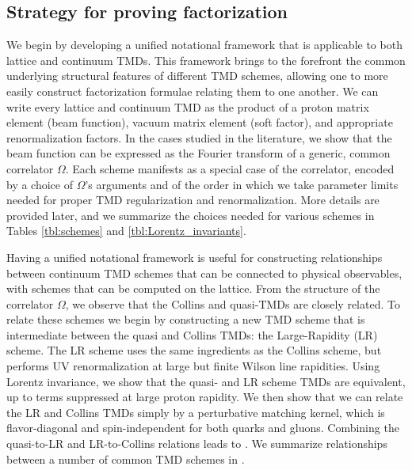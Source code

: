 \documentclass[11pt,a4paper]{article}
\newcommand{\Corr}{\Omega}
\begin{document}
\subsection{Strategy for proving factorization} 
\label{sec:strategy}

We begin by developing a unified notational framework that is applicable to both lattice and continuum TMDs. 
This framework brings to the forefront the common underlying structural features of different TMD schemes, allowing one to more easily construct factorization formulae relating them to one another. 
We can write every lattice and continuum TMD as the product of a 
proton matrix element (beam function), vacuum matrix element (soft factor), 
and appropriate renormalization factors. 
In the cases studied in the literature, we show that the beam function 
can be expressed
as the Fourier transform of a generic, common correlator 
$\Corr$. Each scheme manifests as a special case of the correlator, encoded by 
a choice of $\Corr$'s arguments and of the order in which we take parameter limits needed for proper TMD regularization and renormalization.
%
More details are provided later, and we summarize the choices needed for various schemes in Tables \ref{tbl:schemes} and \ref{tbl:Lorentz_invariants}. 
	
Having a unified notational framework is useful for constructing relationships between continuum TMD schemes that can be connected to physical observables, with schemes that can be computed on the lattice. 
From the structure of the correlator $\Corr$, we observe that the Collins and quasi-TMDs are closely related. 
To relate these schemes we begin by constructing a new TMD scheme that is intermediate between the quasi and Collins TMDs: the Large-Rapidity (LR) scheme.
The LR scheme uses the same ingredients as the Collins scheme, but performs UV renormalization at large but finite Wilson line rapidities.
Using Lorentz invariance, we show that the quasi- and LR scheme TMDs are equivalent, up to terms suppressed at large proton rapidity. 
We then show that we can relate the LR and Collins TMDs simply by a perturbative matching kernel, which is flavor-diagonal and spin-independent for both quarks and gluons. 
Combining the quasi-to-LR and LR-to-Collins relations leads to . We summarize relationships between a number of common TMD schemes in .
	
\end{document}
